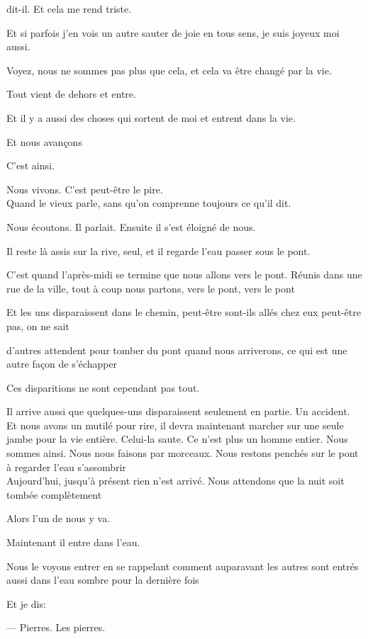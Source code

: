dit-il. Et cela me rend triste.

Et si parfois j'en vois un autre sauter de joie en tous sens, je suis
joyeux moi aussi.

Voyez, nous ne sommes pas plus que cela, et cela va être changé par la
vie.

Tout vient de dehors et entre.

Et il y a aussi des choses qui sortent de moi et entrent dans la vie.

Et nous avançons

C'est ainsi.

Nous vivons. C'est peut-être le pire.\\

Quand le vieux parle, sans qu'on comprenne toujours ce qu'il dit.

Nous écoutons. Il parlait. Ensuite il s'est éloigné de nous.

Il reste là assis sur la rive, seul, et il regarde l'eau passer sous le
pont.

C'est quand l'après-midi se termine que nous allons vers le pont. Réunis
dans une rue de la ville, tout à coup nous partons, vers le pont, vers
le pont

Et les uns disparaissent dans le chemin, peut-être sont-ils allés chez
eux peut-être pas, on ne sait

d'autres attendent pour tomber du pont quand nous arriverons, ce qui est
une autre façon de s'échapper

Ces disparitions ne sont cependant pas tout.

Il arrive aussi que quelques-uns disparaissent seulement en partie. Un
accident. Et nous avons un mutilé pour rire, il devra maintenant marcher
sur une seule jambe pour la vie entière. Celui-la saute. Ce n'est plus
un homme entier. Nous sommes ainsi. Nous nous faisons par morceaux. Nous
restons penchés sur le pont à regarder l'eau s'assombrir\\

Aujourd'hui, jusqu'à présent rien n'est arrivé. Nous attendons que la
nuit soit tombée complètement

Alors l'un de nous y va.

Maintenant il entre dans l'eau.

Nous le voyons entrer en se rappelant comment auparavant les autres sont
entrés aussi dans l'eau sombre pour la dernière fois

Et je dis:

--- Pierres. Les pierres.

